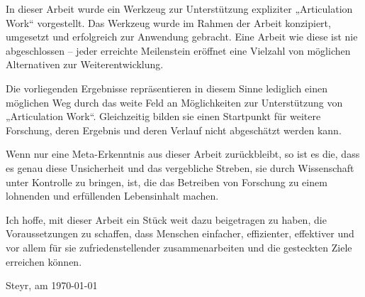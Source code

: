 In dieser Arbeit wurde ein Werkzeug zur Unterstützung expliziter „Articulation Work“ vorgestellt. Das Werkzeug wurde im Rahmen der Arbeit konzipiert, umgesetzt und erfolgreich zur Anwendung gebracht. Eine Arbeit wie diese ist nie abgeschlossen -- jeder erreichte Meilenstein eröffnet eine Vielzahl von möglichen Alternativen zur Weiterentwicklung. 

Die vorliegenden Ergebnisse repräsentieren in diesem Sinne lediglich einen möglichen Weg durch das weite Feld an Möglichkeiten zur Unterstützung von „Articulation Work“. Gleichzeitig bilden sie einen Startpunkt für weitere Forschung, deren Ergebnis und deren Verlauf nicht abgeschätzt werden kann. 

Wenn nur eine Meta-Erkenntnis aus dieser Arbeit zurückbleibt, so ist es die, dass es genau diese Unsicherheit und das vergebliche Streben, sie durch Wissenschaft unter Kontrolle zu bringen, ist, die das Betreiben von Forschung zu einem lohnenden und erfüllenden Lebensinhalt machen. 

Ich hoffe, mit dieser Arbeit ein Stück weit dazu beigetragen zu haben, die Voraussetzungen zu schaffen, dass Menschen einfacher, effizienter, effektiver und vor allem für sie zufriedenstellender zusammenarbeiten und die gesteckten Ziele erreichen können.

\begin{flushright}
 Steyr, am \today
\end{flushright}

